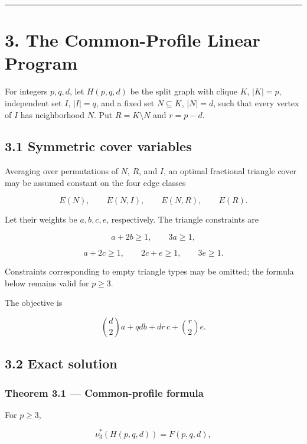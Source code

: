 \documentclass[11pt,a4paper]{article}
\begin{document}
\begin{center}\rule{0.5\linewidth}{0.5pt}\end{center}

\section{3. The Common-Profile Linear Program}\label{the-common-profile-linear-program}

For integers \(p,q,d\), let \(H(p,q,d)\) be the split graph with clique \(K\), \(|K|=p\), independent set \(I\), \(|I|=q\), and a fixed set \(N\subseteq K\), \(|N|=d\), such that every vertex of \(I\) has neighborhood \(N\). Put \(R=K\setminus N\) and \(r=p-d\).

\subsection{3.1 Symmetric cover variables}\label{symmetric-cover-variables}

Averaging over permutations of \(N\), \(R\), and \(I\), an optimal fractional triangle cover may be assumed constant on the four edge classes

\[
E(N),
\qquad E(N,I),
\qquad E(N,R),
\qquad E(R).
\]

Let their weights be \(a,b,c,e\), respectively. The triangle constraints are

\[
a+2b\ge1,
\qquad
3a\ge1,
\tag{3.1}
\]

\[
a+2c\ge1,
\qquad
2c+e\ge1,
\qquad
3e\ge1.
\tag{3.2}
\]

Constraints corresponding to empty triangle types may be omitted; the formula below remains valid for \(p\ge3\).

The objective is

\[
\binom d2a+qdb+dr\,c+\binom r2e.
\tag{3.3}
\]

\subsection{3.2 Exact solution}\label{exact-solution}

\subsubsection{Theorem 3.1 --- Common-profile formula}\label{theorem-3.1-common-profile-formula}

For \(p\ge3\),

\[
\boxed{
\nu_3^*(H(p,q,d))
=
F(p,q,d),
}
\tag{3.4}
\]
\end{document}
